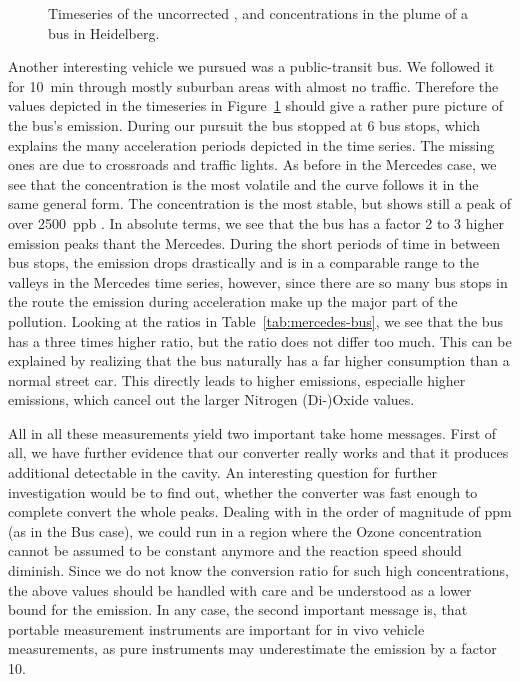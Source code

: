 \begin{figure}[htbp]
  \centering
  
  \caption{Timeseries of the uncorrected ,  and 
    concentrations in the plume of a bus in Heidelberg.}
  \label{fig:bus-ts}
\end{figure}

Another interesting vehicle we pursued was a public-transit bus. We
followed it for \SI{10}{\minute} through mostly suburban areas with
almost no traffic. Therefore the values depicted in the timeseries in
Figure~\ref{fig:bus-ts} should give a rather pure picture of the bus's
emission. During our pursuit the bus stopped at 6 bus stops, which
explains the many acceleration periods depicted in the time
series. The missing ones are due to crossroads and traffic lights. As
before in the Mercedes case, we see that the  concentration
is the most volatile and the  curve follows it in the same
general form. The  concentration is the most stable, but shows
still a peak of over \SI{2500}{ppb} . In absolute terms, we
see that the bus has a factor 2 to 3 higher  emission peaks
thant the Mercedes. During the short periods of time in between bus
stops, the emission drops drastically and is in a comparable range to
the valleys in the Mercedes time series, however, since there are so
many bus stops in the route the emission during acceleration make up
the major part of the pollution. Looking at the ratios in
Table~\ref{tab:mercedes-bus}, we see that the bus has a three times
higher  ratio, but the  ratio does not differ too
much. This can be explained by realizing that the bus naturally has a
far higher consumption than a normal street car. This directly leads
to higher emissions, especialle higher  emissions, which
cancel out the larger Nitrogen (Di-)Oxide values. 

All in all these measurements yield two important take home
messages. First of all, we have further evidence that our converter
really works and that it produces additional detectable  in
the cavity. An interesting question for further investigation would be
to find out, whether the converter was fast enough to complete convert
the whole  peaks. Dealing with  in the order of
magnitude of ppm (as in the Bus case), we could run in a region where
the Ozone concentration cannot be assumed to be constant anymore and
the reaction speed should diminish. Since we do not know the
conversion ratio for such high concentrations, the above 
values should be handled with care and be understood as a lower bound
for the emission. In any case, the second important message is, that
portable  measurement instruments are important for in vivo
vehicle measurements, as pure  instruments may underestimate
the  emission by a factor 10. 

